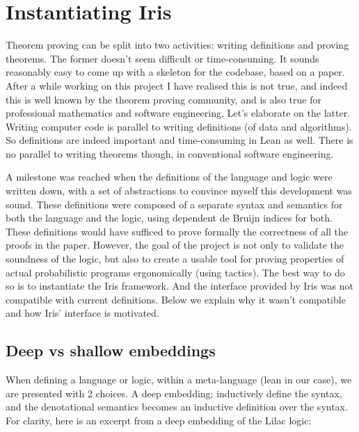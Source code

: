 
\section{Instantiating Iris}
Theorem proving can be split into two activities: writing definitions and proving theorems. The former doesn't seem difficult or time-consuming. It sounds reasonably
easy to come up with a skeleton for the codebase, based on a paper. After a while working on this project I have realised this is not true, and indeed this is well known
by the theorem proving community, and is also true for professional mathematics and software engineering. Let's elaborate on the latter. Writing computer code is parallel
to writing definitions (of data and algorithms). So definitions are indeed important and time-consuming in Lean as well. There is no parallel to writing theorems though, in conventional software engineering. 

A milestone was reached when the definitions of the language and logic were written down, with a set of abstractions to convince myself this development was sound.
These definitions were composed of a separate syntax and semantics for both the language and the logic, using dependent de Bruijn indices for both. These definitions
would have sufficed to prove formally the correctness of all the proofs in the paper. However, the goal of the project is not only to validate the soundness of the logic,
but also to create a usable tool for proving properties of actual probabilistic programs ergonomically (using tactics). The best way to do so is to instantiate the Iris
framework. And the interface provided by Iris was not compatible with current definitions. Below we explain why it wasn't compatible and how Iris' interface is motivated.

\subsection{Deep vs shallow embeddings}
When defining a language or logic, within a meta-language (lean in our case), we are presented with 2 choices. A deep embedding; inductively define the syntax,
and the denotational semantics becomes an inductive definition over the syntax. For clarity, here is an excerpt from a deep embedding of the Lilac logic:



